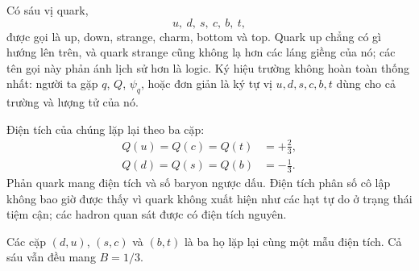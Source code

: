 \begin{classroomqa}
\end{classroomqa}

Có sáu vị quark,
\begin{equation}
u,\ d,\ s,\ c,\ b,\ t,
\end{equation}
được gọi là up, down, strange, charm, bottom và top. Quark up chẳng có gì hướng lên trên, và quark strange cũng không lạ hơn các láng giềng của nó; các tên gọi này phản ánh lịch sử hơn là logic. Ký hiệu trường không hoàn toàn thống nhất: người ta gặp \(q\), \(Q\), \(\psi_q\), hoặc đơn giản là ký tự vị \(u,d,s,c,b,t\) dùng cho cả trường và lượng tử của nó.

\begin{classroomqa}
\end{classroomqa}

Điện tích của chúng lặp lại theo ba cặp:
\begin{equation}
\begin{aligned}
Q(u)=Q(c)=Q(t)&=+\frac23,
\\
Q(d)=Q(s)=Q(b)&=-\frac13.
\end{aligned}
\end{equation}
Phản quark mang điện tích và số baryon ngược dấu. Điện tích phân số cô lập không bao giờ được thấy vì quark không xuất hiện như các hạt tự do ở trạng thái tiệm cận; các hadron quan sát được có điện tích nguyên.

Các cặp \((d,u)\), \((s,c)\) và \((b,t)\) là ba họ lặp lại cùng một mẫu điện tích. Cả sáu vẫn đều mang \(B=1/3\).

\begin{classroomqa}
\end{classroomqa}

